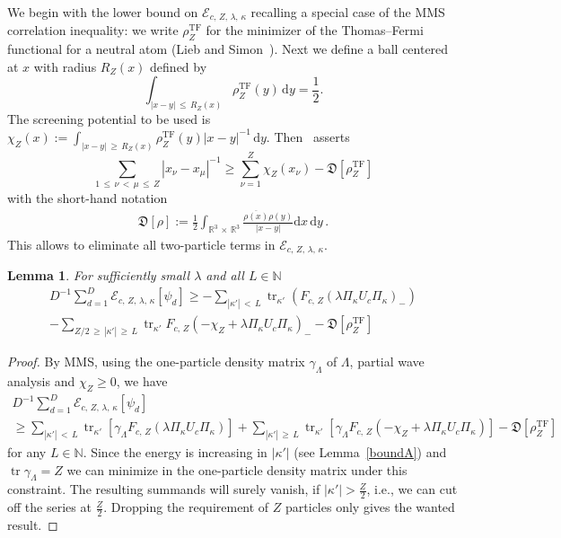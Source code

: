 \documentclass[10pt]{amsart}
\newtheorem{lemm}[cdrthm]{Lemma}
\theoremstyle{definition}
\newcommand{\TF}{\mathrm{TF}}
\DeclareMathOperator{\tr}{tr}
\newcommand*\dx{\mathrm{d}x}
\newcommand*\dy{\mathrm{d}y}
\newcommand*\nz{\mathbb{N}}
\newcommand*\rz{\mathbb{R}}
\newcommand*\cE{\mathcal{E}}
\newcommand*\gD{\mathfrak{D}}
\begin{document}
We begin with the lower bound on $\cE_{c,\,Z,\,\lambda,\,\kappa}$ recalling a special case of the MMS correlation inequality: we write $\rho_Z^{\TF}$ for the minimizer of the Thomas--Fermi functional for a neutral atom (Lieb and Simon~\cite[Theorem~II.20]{LiebSimon1977}). Next we define a ball centered at $x$ with radius $R_Z(x)$ defined by
\[
\int_{|x-y|\,\leq\,R_Z(x)}\rho_Z^{\TF}(y)\,\dy=\frac12.
\]
The screening potential to be used is $\chi_Z(x):=\int_{|x-y|\,\geq\,R_Z(x)}\rho_Z^{\TF}(y)|x-y|^{-1}\,\dy$. Then~\cite{Mancasetal2004} asserts
\begin{equation}\label{MMS}
\sum_{1\,\leq\,\nu\,<\,\mu\,\leq\,Z}|x_\nu-x_\mu|^{-1}
\geq \sum_{\nu=1}^Z\chi_Z(x_\nu)-\gD\left[\rho_Z^{\TF}\right]
\end{equation}
with the short-hand notation
\begin{align*}
\gD[\rho] := \frac12 \int_{\rz^3\,\times\,\rz^3}\frac{\overline{\rho(x)}\rho(y)}{|x-y|}\dx\,\dy\,.
\end{align*}
This allows to eliminate all two-particle terms in $\cE_{c,\,Z,\,\lambda,\,\kappa}$.


\begin{lemm}\label{correlation}
For sufficiently small $\lambda$ and all $L\in\nz$
\begin{multline}\label{Korrelation}
D^{-1}\sum_{d=1}^D\cE_{c,\,Z,\,\lambda,\,\kappa}\left[\psi_d\right]
\geq -\sum_{|{\kappa'}|\,<\,L}\tr_{\kappa'}\left(F_{c,\,Z}\left(\lambda\Pi_{\kappa} U_c\Pi_{\kappa}\right)_{-} \right)  \\
- \sum_{Z/2\,\geq\,|{\kappa'}|\,\geq\,L}\tr_{\kappa'} F_{c,\,Z}\left(-\chi_Z+\lambda \Pi_\kappa U_c\Pi_\kappa\right)_- - \gD\left[\rho_Z^{\TF}\right]
\end{multline}
\end{lemm}

\begin{proof}
By MMS, using the one-particle density matrix $\gamma_\Lambda$ of $\Lambda$, partial wave analysis and $\chi_Z\geq0$, we have
\begin{multline}
D^{-1}\sum_{d=1}^D\cE_{c,\,Z,\,\lambda,\,\kappa}\left[\psi_d\right] \\
\geq \sum_{|{\kappa'}|\,<\,L}\tr_{\kappa'}\left[\gamma_\Lambda F_{c,\,Z}\left(\lambda\Pi_\kappa U_c\Pi_\kappa\right)\right] + \sum_{|{\kappa'}|\,\geq\,L}\tr_{\kappa'}\left[\gamma_\Lambda F_{c,\,Z}\left(-\chi_Z+\lambda \Pi_\kappa U_c\Pi_\kappa\right)\right] - \gD\left[\rho_Z^{\TF}\right]
\end{multline}
for any $L\in\nz$. Since the energy is increasing in $|\kappa'|$ (see Lemma~\ref{boundA}) and $\tr\gamma_\Lambda=Z$ we can minimize in the one-particle density matrix under this constraint. The resulting summands will surely vanish, if $|{\kappa'}|>\tfrac{Z}{2}$, i.e., we can cut off the series at $\tfrac{Z}{2}$. Dropping the requirement of $Z$ particles only gives the wanted result.
\end{proof}
\end{document}
